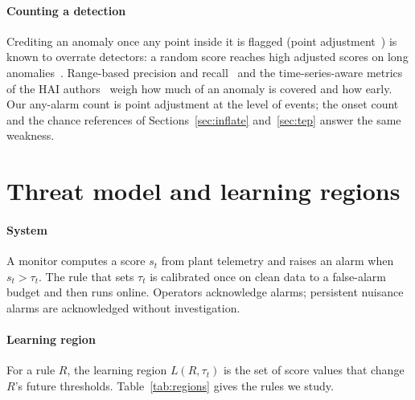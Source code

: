 \documentclass[sigconf]{acmart}
\begin{document}
\paragraph{Counting a detection}
Crediting an anomaly once any point inside it is flagged (point adjustment~\cite{xu2018vae}) is known
to overrate detectors: a random score reaches high adjusted scores on long
anomalies~\cite{kim2022rigorous}. Range-based precision and recall~\cite{tatbul2018precision} and the
time-series-aware metrics of the HAI authors~\cite{hwang2019tapr} weigh how much of an anomaly is covered
and how early. Our any-alarm count is point adjustment at the level of events; the onset count and the
chance references of Sections~\ref{sec:inflate} and~\ref{sec:tep} answer the same weakness.

\section{Threat model and learning regions}
\label{sec:threat}

\paragraph{System}
A monitor computes a score $s_t$ from plant telemetry and raises an alarm when $s_t > \tau_t$. The
rule that sets $\tau_t$ is calibrated once on clean data to a false-alarm budget and then runs
online. Operators acknowledge alarms; persistent nuisance alarms are acknowledged without
investigation.

\paragraph{Learning region}
For a rule $R$, the learning region $L(R, \tau_t)$ is the set of score values that change $R$'s
future thresholds. Table~\ref{tab:regions} gives the rules we study.
\end{document}
